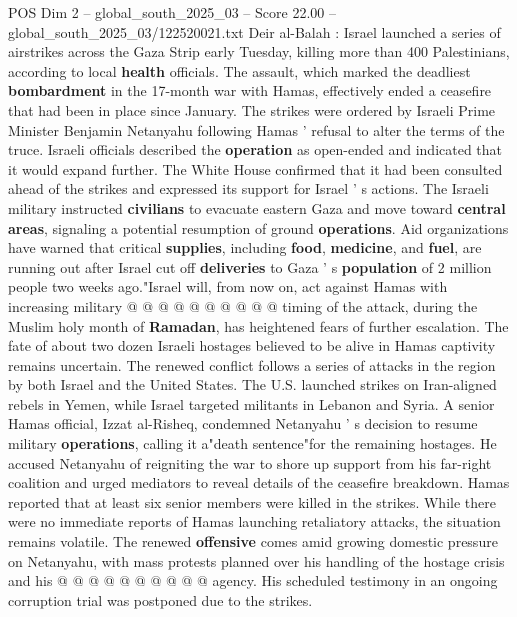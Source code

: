 \begin{textsample}{POS Dim 2 – global\_south\_2025\_03 – Score 22.00 – global\_south\_2025\_03/122520021.txt}  \label{ex:f2_pos_308}
Deir al-Balah : Israel launched a series of airstrikes across the Gaza Strip early Tuesday, killing more than 400 Palestinians, according to local \textbf{health} officials.
The assault, which marked the deadliest \textbf{bombardment} in the 17-month war with Hamas, effectively ended a ceasefire that had been in place since January.
The strikes were ordered by Israeli Prime Minister Benjamin Netanyahu following Hamas ' refusal to alter the terms of the truce.
Israeli officials described the \textbf{operation} as open-ended and indicated that it would expand further.
The White House confirmed that it had been consulted ahead of the strikes and expressed its support for Israel ' s actions.
The Israeli military instructed \textbf{civilians} to evacuate eastern Gaza and move toward \textbf{central} \textbf{areas}, signaling a potential resumption of ground \textbf{operations}.
Aid organizations have warned that critical \textbf{supplies}, including \textbf{food}, \textbf{medicine}, and \textbf{fuel}, are running out after Israel cut off \textbf{deliveries} to Gaza ' s \textbf{population} of 2 million people two weeks ago."Israel will, from now on, act against Hamas with increasing military @ @ @ @ @ @ @ @ @ @ timing of the attack, during the Muslim holy month of \textbf{Ramadan}, has heightened fears of further escalation.
The fate of about two dozen Israeli hostages believed to be alive in Hamas captivity remains uncertain.
The renewed conflict follows a series of attacks in the region by both Israel and the United States.
The U.S. launched strikes on Iran-aligned rebels in Yemen, while Israel targeted militants in Lebanon and Syria.
A senior Hamas official, Izzat al-Risheq, condemned Netanyahu ' s decision to resume military \textbf{operations}, calling it a"death sentence"for the remaining hostages.
He accused Netanyahu of reigniting the war to shore up support from his far-right coalition and urged mediators to reveal details of the ceasefire breakdown.
Hamas reported that at least six senior members were killed in the strikes.
While there were no immediate reports of Hamas launching retaliatory attacks, the situation remains volatile.
The renewed \textbf{offensive} comes amid growing domestic pressure on Netanyahu, with mass protests planned over his handling of the hostage crisis and his @ @ @ @ @ @ @ @ @ @ agency.
His scheduled testimony in an ongoing corruption trial was postponed due to the strikes.

\end{textsample}
